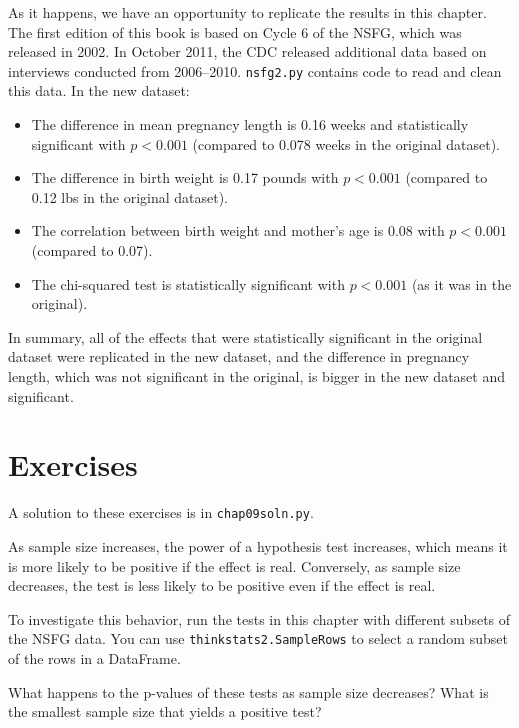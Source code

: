 \documentclass[12pt]{book}
\begin{document}
As it happens, we have an opportunity to replicate the results in this
chapter.  The first edition of this book is based on Cycle 6 of the
NSFG, which was released in 2002.  In October 2011, the CDC released
additional data based on interviews conducted from 2006--2010.  \verb"nsfg2.py"
contains code to read and clean this data.  In the new
dataset:

\begin{itemize}

\item The difference in mean pregnancy length is
0.16 weeks and statistically significant with $p < 0.001$ (compared
to 0.078 weeks in the original dataset).
 

\item The difference in birth weight is 0.17 pounds with $p < 0.001$
(compared to 0.12 lbs in the original dataset).

\item The correlation between birth weight and mother's age is
0.08 with $p < 0.001$ (compared to 0.07).

\item The chi-squared test is statistically significant with
$p < 0.001$ (as it was in the original).

\end{itemize}

In summary, all of the effects that were statistically significant
in the original dataset were replicated in the new dataset, and the
difference in pregnancy length, which was not significant in the
original, is bigger in the new dataset and significant.


\section{Exercises}

A solution to these exercises is in \verb"chap09soln.py".

\begin{exercise}
As sample size increases, the power of a hypothesis test increases,
which means it is more likely to be positive if the effect is real.
Conversely, as sample size decreases, the test is less likely to
be positive even if the effect is real.

To investigate this behavior, run the tests in this chapter with
different subsets of the NSFG data.  You can use \verb"thinkstats2.SampleRows"
to select a random subset of the rows in a DataFrame.

What happens to the p-values of these tests as sample size decreases?
What is the smallest sample size that yields a positive test?
\end{exercise}
\end{document}
